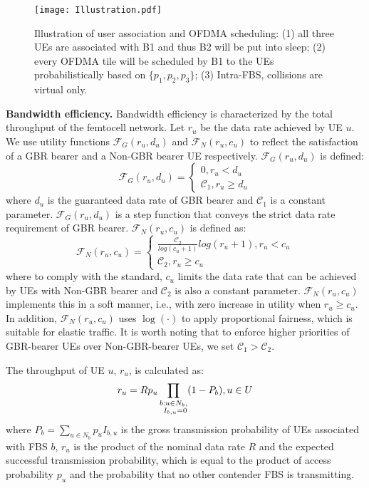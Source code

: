 \documentclass[conference]{IEEEtran}
\begin{document}
\begin{figure}[t]
\centering
\texttt{[image: Illustration.pdf]}
\caption{Illustration of user association and OFDMA scheduling: (1) all three UEs are associated with B1 and thus B2 will be put into sleep; (2) every OFDMA tile will be scheduled by B1 to the UEs probabilistically based on $\{p_1, p_2, p_3\}$; (3) Intra-FBS, collisions are virtual only.}
\label{fig:1}
\end{figure}








\noindent\textbf{Bandwidth efficiency.} Bandwidth efficiency is characterized by the total throughput of the femtocell network. Let $r_u$ be the data rate achieved by UE $u$. We use utility functions $\mathcal{F}_G (r_u,d_u)$ and $\mathcal{F}_N (r_u,c_u)$ to reflect the satisfaction of a GBR bearer and a Non-GBR bearer UE respectively. $\mathcal{F}_G (r_u,d_u)$ is defined:
\begin{equation}
\mathcal{F}_G (r_u,d_u) = 
\begin{cases}
0,r_u < d_u \\
\mathcal{C}_1, r_u \geq d_u
\end{cases}
\label{eq:1}
\end{equation}
where $d_u$ is the guaranteed data rate of GBR bearer and $\mathcal{C}_1$ is a constant parameter. $\mathcal{F}_G (r_u,d_u)$ is a step function that conveys the strict data rate requirement of GBR bearer. $\mathcal{F}_N (r_u,c_u)$ is defined as:
\begin{equation}
\mathcal{F}_N (r_u,c_u) = 
\begin{cases}
\frac{\mathcal{C}_2 }{log(c_u+1)}log(r_u+1) ,r_u < c_u \\
\mathcal{C}_2, r_u \geq c_u
\end{cases}
\end{equation}
where to comply with the standard, $c_u$ limits the data rate that can be achieved by UEs with Non-GBR bearer and $\mathcal{C}_2$ is also a constant parameter. $\mathcal{F}_N (r_u,c_u)$ implements this in a soft manner, i.e., with zero increase in utility when $r_u\geq c_u$. In addition, $\mathcal{F}_N (r_u,c_u)$ uses $\log(\cdot)$ to apply proportional fairness, which is suitable for elastic traffic. It is worth noting that to enforce higher priorities of GBR-bearer UEs over Non-GBR-bearer UEs, we set $\mathcal{C}_1 > \mathcal{C}_2$.

The throughput of UE $u$, $r_u$, is calculated as:
\begin{equation}
r_u = Rp_u \prod\limits_{
\begin{subarray}{c}
b: u\in N_b,\\
 \ I_{b,u} = 0
\end{subarray}}(1-P_b),	u \in U
\end{equation}
where $P_b = \sum_{u \in N_b} p_u I_{b,u}$ is the gross transmission probability of UEs associated with FBS $b$, $r_u$ is the product of the nominal data rate $R$ and the expected successful transmission probability, which is equal to the product of access probability $p_u$ and the probability that no other contender FBS is transmitting. 
\end{document}
